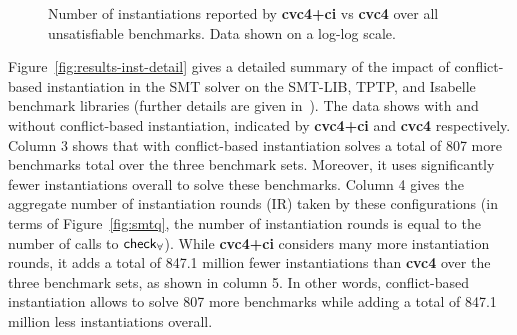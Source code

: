 \documentclass{easychair}
\begin{document}
\begin{figure}[t]
\caption{ Number of instantiations reported by
{\bf cvc4+ci} vs {\bf cvc4} over all unsatisfiable benchmarks.
Data shown on a log-log scale.
}
\label{fig:cbqi-scatter}
\end{figure}

Figure~\ref{fig:results-inst-detail}
gives a detailed summary of the impact of conflict-based instantiation in the SMT solver \cvc
on the SMT-LIB, TPTP, and Isabelle benchmark libraries (further details are given in~\cite{ReynoldsTinelliMoura14}).
The data shows \cvc with and without conflict-based instantiation, indicated by {\bf cvc4+ci} and {\bf cvc4} respectively.
Column 3 shows that \cvc with conflict-based instantiation
solves a total of 807 more benchmarks total over the three benchmark sets.
Moreover, it uses significantly fewer instantiations overall to solve these benchmarks.
Column 4 gives the aggregate number of instantiation rounds (IR) taken by these configurations
(in terms of Figure~\ref{fig:smtq}, the number of instantiation rounds is equal to the number of calls to $\small\mathsf{check}_\forall$).
While {\bf cvc4+ci} considers many more instantiation rounds, it adds a total
of 847.1 million fewer instantiations than {\bf cvc4} over the three benchmark sets, as shown in column 5.
In other words, conflict-based instantiation allows \cvc to solve 807 more benchmarks while adding a total of 847.1 million 
less instantiations overall.
\end{document}
